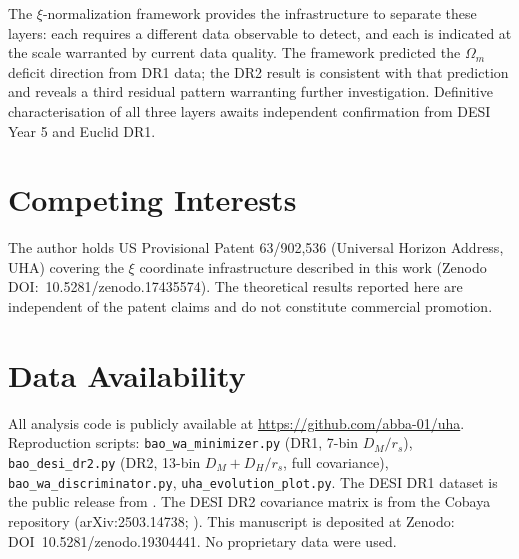 \documentclass[12pt,a4paper]{article}
\begin{document}
The $\xi$-normalization framework provides the infrastructure to separate these
layers: each requires a different data observable to detect, and each is
indicated at the scale warranted by current data quality. The framework
predicted the $\Omega_m$ deficit direction from DR1 data; the DR2 result is
consistent with that prediction and reveals a third residual pattern warranting
further investigation. Definitive characterisation of all three layers awaits
independent confirmation from DESI Year 5 and Euclid DR1.

\section*{Competing Interests}

The author holds US Provisional Patent 63/902,536 (Universal Horizon Address,
UHA) covering the $\xi$ coordinate infrastructure described in this work
(Zenodo DOI:~10.5281/zenodo.17435574). The theoretical results reported here
are independent of the patent claims and do not constitute commercial promotion.

\section*{Data Availability}

All analysis code is publicly available at \url{https://github.com/abba-01/uha}.
Reproduction scripts: \texttt{bao\_wa\_minimizer.py} (DR1, 7-bin $D_M/r_s$),
\texttt{bao\_desi\_dr2.py} (DR2, 13-bin $D_M+D_H/r_s$, full covariance),
\texttt{bao\_wa\_discriminator.py}, \texttt{uha\_evolution\_plot.py}.
The DESI DR1 dataset is the public release from \citet{DESI_2024_DR1}.
The DESI DR2 covariance matrix is from the Cobaya repository
(arXiv:2503.14738; \citealt{DESI_2025_DR2}).
This manuscript is deposited at Zenodo: DOI~10.5281/zenodo.19304441.
No proprietary data were used.

%
%
\end{document}
